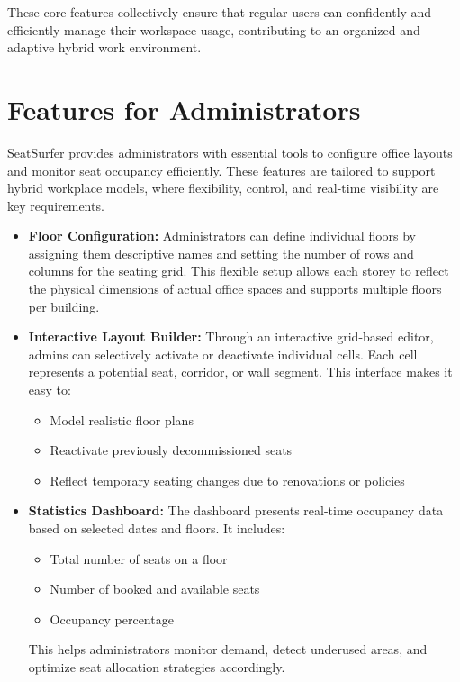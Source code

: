 \documentclass[12pt,a4paper]{report} %
\begin{document}
These core features collectively ensure that regular users can confidently and efficiently manage their workspace usage, contributing to an organized and adaptive hybrid work environment.

\section{Features for Administrators}

SeatSurfer provides administrators with essential tools to configure office layouts and monitor seat occupancy efficiently. These features are tailored to support hybrid workplace models, where flexibility, control, and real-time visibility are key requirements.

\begin{itemize}
    \item \textbf{Floor Configuration:}  
    Administrators can define individual floors by assigning them descriptive names and setting the number of rows and columns for the seating grid. This flexible setup allows each storey to reflect the physical dimensions of actual office spaces and supports multiple floors per building.

    \item \textbf{Interactive Layout Builder:}  
    Through an interactive grid-based editor, admins can selectively activate or deactivate individual cells. Each cell represents a potential seat, corridor, or wall segment. This interface makes it easy to:
    \begin{itemize}
        \item Model realistic floor plans
        \item Reactivate previously decommissioned seats
        \item Reflect temporary seating changes due to renovations or policies
    \end{itemize}

    \item \textbf{Statistics Dashboard:}  
    The dashboard presents real-time occupancy data based on selected dates and floors. It includes:
    \begin{itemize}
        \item Total number of seats on a floor
        \item Number of booked and available seats
        \item Occupancy percentage
    \end{itemize}
    This helps administrators monitor demand, detect underused areas, and optimize seat allocation strategies accordingly.
\end{itemize}
\end{document}
